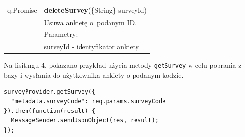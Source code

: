\documentclass[8pt,a4paper,notitlepage]{article}
\begin{document}
\begin{center}
\begin{table}[H]
\begin{tabular}{| l| l|}
q.Promise	&	\textbf{deleteSurvey}(\{String\} surveyId) \\
 &  Usuwa ankietę o~podanym ID.\\ 
 & Parametry: \\
 & surveyId - identyfikator ankiety \\ 
 \hline
  \end{tabular}
\end{table}
\end{center}

\par Na lisitingu 4. pokazano przykład użycia metody \texttt{getSurvey} w celu pobrania z bazy i wysłania do użytkownika ankiety o podanym kodzie.

\begin{lstlisting}[caption=Przykład użycia metody \texttt{getSurvey} ]
surveyProvider.getSurvey({
  "metadata.surveyCode": req.params.surveyCode
}).then(function(result) {
  MessageSender.sendJsonObject(res, result);
});
\end{lstlisting}
\end{document}
